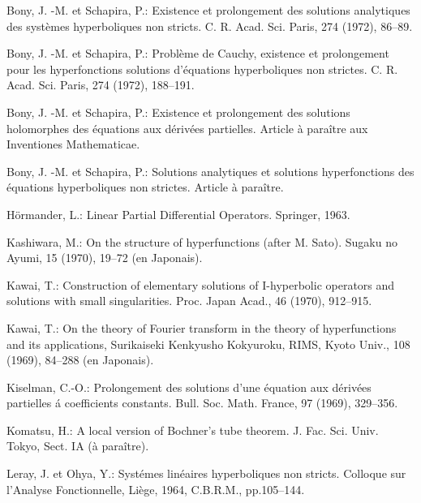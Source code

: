 \begin{thebibliography}{20} 
     Bony, J. -M. et Schapira, P.: 
    Existence et prolongement des solutions analytiques 
    des systèmes hyperboliques non stricts. 
    C. R. Acad. Sci. Paris, 274 (1972), 86--89.

     Bony, J. -M. et Schapira, P.: 
    Problème de Cauchy, existence et prolongement 
    pour les hyperfonctions solutions d'équations hyperboliques 
    non strictes. C. R. Acad. Sci. Paris, 274 (1972), 188--191.

     Bony, J. -M. et Schapira, P.: 
    Existence et prolongement des solutions holomorphes 
    des \'equations aux d\'eriv\'ees partielles. 
    Article \`a para\^itre aux Inventiones Mathematicae.
   
     Bony, J. -M. et Schapira, P.: 
    Solutions analytiques et solutions hyperfonctions 
    des \'equations hyperboliques non strictes. 
    Article \`a para\^itre.

     H\"ormander, L.: 
    Linear Partial Differential Operators. Springer, 1963.

     Kashiwara, M.: 
    On the structure of hyperfunctions (after M. Sato). 
    Sugaku no Ayumi, 15 (1970), 19--72 (en Japonais).

    Kawai, T.: 
    Construction of elementary solutions of 
    I-hyperbolic operators and solutions 
    with small singularities. 
    Proc. Japan Acad., 46 (1970), 912--915.

    Kawai, T.: 
    On the theory of Fourier transform 
    in the theory of hyperfunctions and its applications, 
    Surikaiseki Kenkyusho Kokyuroku, RIMS, 
    Kyoto Univ., 108 (1969), 84--288 (en Japonais).
    
    Kiselman, C.-O.: 
    Prolongement des solutions d’une \'equation aux d\'eriv\'ees 
    partielles \'a coefficients constants. 
    Bull. Soc. Math. France, 97 (1969), 329--356.

    Komatsu, H.: 
    A local version of Bochner’s tube theorem. 
    J. Fac. Sci. Univ. Tokyo, Sect. IA (\`a para\^itre).

    Leray, J. et Ohya, Y.: 
    Syst\'emes lin\'eaires hyperboliques non stricts. 
    Colloque sur l’Analyse Fonctionnelle, 
    Li\`ege, 1964, C.B.R.M., pp.105--144.


\end{thebibliography}
